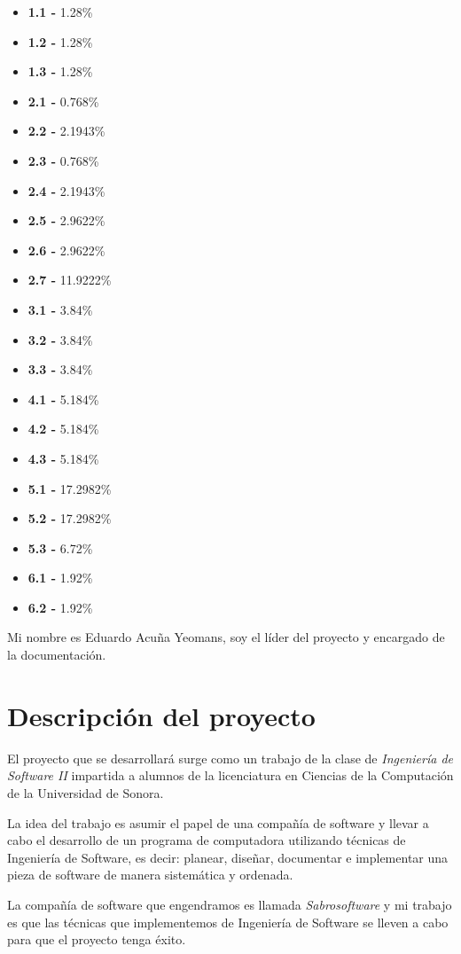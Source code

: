 \documentclass[letterpaper]{article}
\begin{document}
\begin{itemize}
\item \textbf{1.1 -} 1.28\%
\item \textbf{1.2 -} 1.28\%
\item \textbf{1.3 -} 1.28\%
\item \textbf{2.1 -} 0.768\%
\item \textbf{2.2 -} 2.1943\%
\item \textbf{2.3 -} 0.768\%
\item \textbf{2.4 -} 2.1943\%
\item \textbf{2.5 -} 2.9622\%
\item \textbf{2.6 -} 2.9622\%
\item \textbf{2.7 -} 11.9222\%
\item \textbf{3.1 -} 3.84\%
\item \textbf{3.2 -} 3.84\%
\item \textbf{3.3 -} 3.84\%
\item \textbf{4.1 -} 5.184\%
\item \textbf{4.2 -} 5.184\%
\item \textbf{4.3 -} 5.184\%
\item \textbf{5.1 -} 17.2982\%
\item \textbf{5.2 -} 17.2982\%
\item \textbf{5.3 -} 6.72\%
\item \textbf{6.1 -} 1.92\%
\item \textbf{6.2 -} 1.92\%
\end{itemize}

Mi nombre es Eduardo Acuña Yeomans, soy el líder del proyecto y encargado de la documentación.

\section{Descripción del proyecto}
El proyecto que se desarrollará surge como un trabajo de la clase de \emph{Ingeniería de Software II} impartida a alumnos de la licenciatura en Ciencias de la Computación de la Universidad de Sonora.

La idea del trabajo es asumir el papel de una compañía de software y llevar a cabo el desarrollo de un programa de computadora utilizando técnicas de Ingeniería de Software, es decir: planear, diseñar, documentar e implementar una pieza de software de manera sistemática y ordenada.

La compañía de software que engendramos es llamada \emph{Sabrosoftware} y mi trabajo es que las técnicas que implementemos de Ingeniería de Software se lleven a cabo para que el proyecto tenga éxito.
\end{document}
